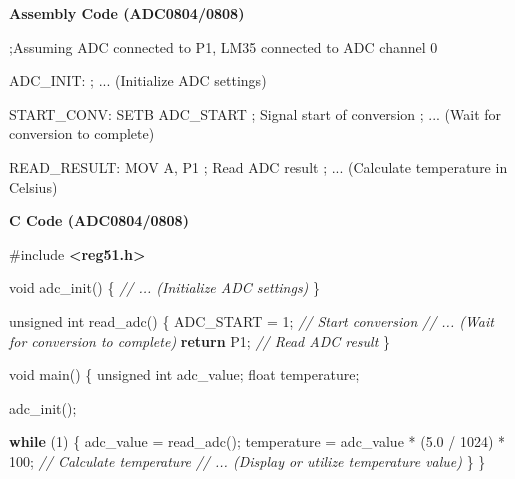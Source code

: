 \documentclass[
]{article}
\newenvironment{Shaded}{}{}
\newcommand{\CommentTok}[1]{\textcolor[rgb]{0.38,0.63,0.69}{\textit{#1}}}
\newcommand{\ControlFlowTok}[1]{\textcolor[rgb]{0.00,0.44,0.13}{\textbf{#1}}}
\newcommand{\DataTypeTok}[1]{\textcolor[rgb]{0.56,0.13,0.00}{#1}}
\newcommand{\DecValTok}[1]{\textcolor[rgb]{0.25,0.63,0.44}{#1}}
\newcommand{\FloatTok}[1]{\textcolor[rgb]{0.25,0.63,0.44}{#1}}
\newcommand{\ImportTok}[1]{\textcolor[rgb]{0.00,0.50,0.00}{\textbf{#1}}}
\newcommand{\NormalTok}[1]{#1}
\newcommand{\OperatorTok}[1]{\textcolor[rgb]{0.40,0.40,0.40}{#1}}
\newcommand{\PreprocessorTok}[1]{\textcolor[rgb]{0.74,0.48,0.00}{#1}}
\begin{document}
\textbf{Assembly Code (ADC0804/0808)}

\begin{Shaded}
\begin{Highlighting}[]
\NormalTok{;Assuming ADC connected to P1, LM35 connected to ADC channel 0}

\NormalTok{ADC\_INIT:}
\NormalTok{    ; ... (Initialize ADC settings)}

\NormalTok{START\_CONV:}
\NormalTok{    SETB ADC\_START  ; Signal start of conversion}
\NormalTok{    ; ... (Wait for conversion to complete)}

\NormalTok{READ\_RESULT:}
\NormalTok{    MOV A, P1      ; Read ADC result}
\NormalTok{    ; ... (Calculate temperature in Celsius)}
\end{Highlighting}
\end{Shaded}

\textbf{C Code (ADC0804/0808)}

\begin{Shaded}
\begin{Highlighting}[]
\PreprocessorTok{\#include }\ImportTok{\textless{}reg51.h\textgreater{}}

\DataTypeTok{void}\NormalTok{ adc\_init}\OperatorTok{()} \OperatorTok{\{}
   \CommentTok{// ... (Initialize ADC settings)}
\OperatorTok{\}}

\DataTypeTok{unsigned} \DataTypeTok{int}\NormalTok{ read\_adc}\OperatorTok{()} \OperatorTok{\{}
\NormalTok{    ADC\_START }\OperatorTok{=} \DecValTok{1}\OperatorTok{;}  \CommentTok{// Start conversion}
    \CommentTok{// ... (Wait for conversion to complete)}
    \ControlFlowTok{return}\NormalTok{ P1}\OperatorTok{;}      \CommentTok{// Read ADC result}
\OperatorTok{\}}

\DataTypeTok{void}\NormalTok{ main}\OperatorTok{()} \OperatorTok{\{}
    \DataTypeTok{unsigned} \DataTypeTok{int}\NormalTok{ adc\_value}\OperatorTok{;}
    \DataTypeTok{float}\NormalTok{ temperature}\OperatorTok{;}

\NormalTok{    adc\_init}\OperatorTok{();}

    \ControlFlowTok{while} \OperatorTok{(}\DecValTok{1}\OperatorTok{)} \OperatorTok{\{}
\NormalTok{        adc\_value }\OperatorTok{=}\NormalTok{ read\_adc}\OperatorTok{();}
\NormalTok{        temperature }\OperatorTok{=}\NormalTok{ adc\_value }\OperatorTok{*} \OperatorTok{(}\FloatTok{5.0} \OperatorTok{/} \DecValTok{1024}\OperatorTok{)} \OperatorTok{*} \DecValTok{100}\OperatorTok{;} \CommentTok{// Calculate temperature}
        \CommentTok{// ... (Display or utilize temperature value)}
    \OperatorTok{\}}
\OperatorTok{\}}
\end{Highlighting}
\end{Shaded}
\end{document}

